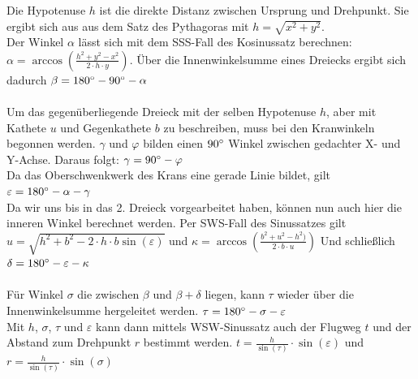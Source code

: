 Die Hypotenuse $h$ ist die direkte Distanz zwischen Ursprung und Drehpunkt. Sie ergibt sich aus aus dem Satz des Pythagoras mit $h=\sqrt{x^2+y^2}$.\\
Der Winkel $\alpha$ lässt sich mit dem SSS-Fall des Kosinussatz berechnen:\\
$\alpha=\arccos(\frac{h^2+y^2-x^2}{2\cdot h\cdot y})$.
Über die Innenwinkelsumme eines Dreiecks ergibt sich dadurch $\beta = 180\degree-90\degree-\alpha$
\\
\\
Um das gegenüberliegende Dreieck mit der selben Hypotenuse $h$, aber mit Kathete $u$ und Gegenkathete $b$ zu beschreiben, muss bei den Kranwinkeln begonnen werden.
$\gamma$ und $\varphi$ bilden einen $90\degree$ Winkel zwischen gedachter X- und Y-Achse. Daraus folgt: $\gamma=90\degree-\varphi$\\
Da das Oberschwenkwerk des Krans eine gerade Linie bildet, gilt $\varepsilon=180\degree-\alpha-\gamma$
\\
Da wir uns bis in das 2. Dreieck vorgearbeitet haben, können nun auch hier die inneren Winkel berechnet werden.
Per SWS-Fall des Sinussatzes gilt $u=\sqrt{h^2+b^2-2\cdot h \cdot b\sin(\varepsilon)}$ und 
$\kappa=\arccos(\frac{b^2+u^2-h^2)}{2\cdot b \cdot u})$
Und schließlich $\delta=180\degree-\varepsilon-\kappa$
\\
\\
Für Winkel $\sigma$ die zwischen $\beta$ und $\beta + \delta$ liegen, kann $\tau$ wieder über die Innenwinkelsumme hergeleitet werden.
$\tau=180\degree-\sigma-\varepsilon$
\\
Mit $h$, $\sigma$, $\tau$ und $\varepsilon$ kann dann mittels WSW-Sinussatz auch der Flugweg $t$ und der Abstand zum Drehpunkt $r$ bestimmt werden. 
$t=\frac{h}{\sin(\tau)}\cdot\sin(\varepsilon)$ und 
$r=\frac{h}{\sin(\tau)}\cdot\sin(\sigma)$
